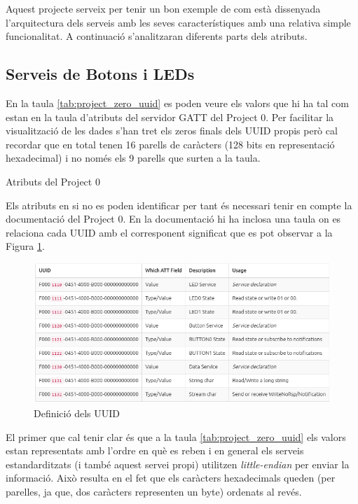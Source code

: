 Aquest projecte serveix per tenir un bon exemple de com està dissenyada l'arquitectura dels serveis amb les seves característiques amb una relativa simple funcionalitat. A continuació s'analitzaran diferents parts dels atributs.

\subsection{Serveis de Botons i LEDs}

En la taula \ref{tab:project_zero_uuid} es poden veure els valors que hi ha tal com estan en la taula d'atributs del servidor GATT del Project 0.
Per facilitar la visualització de les dades s'han tret els zeros finals dels UUID propis però cal recordar que en total tenen 16 parells de caràcters (128 bits en representació hexadecimal) i no només els 9 parells que surten a la taula.
\begin{table}[h!]
	\begin{center}
		\caption{Atributs del Project 0}
		\label{tab:project_zero_uuid}
	\end{center}
\end{table}
Els atributs en si no es poden identificar per tant és necessari tenir en compte la documentació del Project 0.
En la documentació hi ha inclosa una taula on es relaciona cada UUID amb el corresponent significat que es pot observar a la Figura \ref{project0_table}.

\begin{figure}[h!]
	\begin{center}
		\includegraphics[width=\textwidth]{./images/Project_0_UUID.png}
		\caption{Definició dels UUID \cite{project0_UUIDs}}
		\label{project0_table}
	\end{center}
\end{figure}

El primer que cal tenir clar és que a la taula \ref{tab:project_zero_uuid} els valors estan representats amb l'ordre en què es reben i en general els serveis estandarditzats (i també aquest servei propi) utilitzen \textit{little-endian} per enviar la informació.
Això resulta en el fet que els caràcters hexadecimals queden (per parelles, ja que, dos caràcters representen un byte) ordenats al revés.

